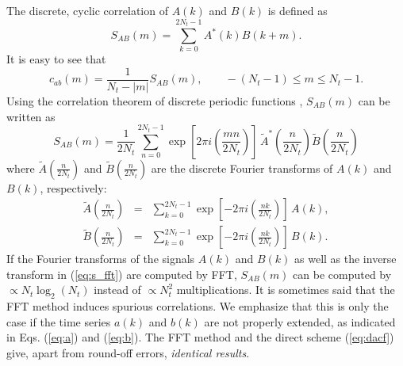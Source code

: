 \documentclass[a4paper,11pt]{report}
\begin{document}
\begin{appendices}
The discrete, cyclic correlation of $A(k)$ and $B(k)$ is defined as
\begin{equation}
\label{eq:s}
S_{AB}(m) = \sum_{k=0}^{2N_t-1} A^*(k)B(k+m).
\end{equation}
It is easy to see that
\begin{equation}
\label{eq:c-s}
c_{ab}(m) = \frac{1}{N_t-|m|}S_{AB}(m),\qquad -(N_t-1) \le m \le N_t-1.
\end{equation}
Using the correlation theorem of discrete periodic functions
\cite{Brigham}, $S_{AB}(m)$ can be written as
\begin{equation}
\label{eq:s_fft}
S_{AB}(m) = \frac{1}{2N_t}\sum_{n=0}^{2N_t-1} 
\exp\left[2\pi i\left(\frac{mn}{2N_t}\right)\right]\,
\tilde A^*\left(\frac{n}{2N_t}\right)\tilde B\left(\frac{n}{2N_t}\right)
\end{equation}
where $\tilde A\left(\frac{n}{2N_t}\right)$ and $\tilde
B\left(\frac{n}{2N_t}\right)$ are the discrete  Fourier transforms of
$A(k)$ and $B(k)$, respectively:
\begin{eqnarray}
\tilde A\left(\frac{n}{2N_t}\right) &=
&\sum_{k=0}^{2N_t-1} \exp\left[-2\pi i\left(\frac{n k}{2N_t}\right)\right]
\,A(k),\\
\tilde B\left(\frac{n}{2N_t}\right) &=
&\sum_{k=0}^{2N_t-1} \exp\left[-2\pi i\left(\frac{n k}{2N_t}\right)\right]
\,B(k).
\end{eqnarray}
If the Fourier transforms of the signals $A(k)$ and $B(k)$ as well as
the inverse transform in (\ref{eq:s_fft}) are computed by FFT,
$S_{AB}(m)$ can be computed by $\propto N_t\log_2(N_t)$ instead of
$\propto N_t^2$ multiplications. It is sometimes said that the FFT
method induces spurious correlations. We emphasize that this is only
the case if the time series $a(k)$ and $b(k)$ are not properly
extended, as indicated in Eqs. (\ref{eq:a}) and (\ref{eq:b}). The FFT
method and the direct scheme (\ref{eq:dacf}) give, apart from
round-off errors, \textit{identical results}.


\end{appendices}
\end{document}
